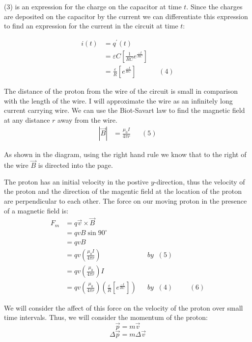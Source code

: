 \documentclass[11pt]{article}
\begin{document}
\vspace{.2in}
\noindent (3) is an expression for the charge on the capacitor at time $t$. Since the charges are deposited on the capacitor by the current we can differentiate this expression to find an expression for the current in the circuit at time $t$: 

\begin{align*}
i(t)&=q^{'}(t)\\&=\varepsilon C\left[\frac{1}{RC}e^{\frac{-t}{RC}}\right]\\&=\frac{\varepsilon}{R}\left[e^{\frac{-t}{RC}}\right]&&(4)
\end{align*}

\vspace{.2in}

\noindent The distance of the proton from the wire of the circuit is small in comparison with the length of the wire. I will approximate the wire as an infinitely long current carrying wire. We can use the Biot-Savart law to find the magnetic field at any distance $r$ away from the wire. 
\begin{align*}
\left|\vec{B}\right|&=\frac{\mu_0I}{4\pi r}&&(5)
\end{align*}

\vspace{.1in}

\noindent As shown in the diagram, using the right hand rule we know that to the right of the wire $\vec{B}$ is directed into the page. 

\vspace{.2in}

\noindent The proton has an initial velocity in the postive $y$-direction, thus the velocity of the proton and the direction of the magentic field at the location of the proton are perpendicular to each other. The force on our moving proton in the presence of a magnetic field is:
\begin{align*}
F_m&=q\vec{v}\times\vec{B}\\&=qvB\sin{90^\circ}\\&=qvB\\&=qv\left(\frac{\mu_0I}{4\pi r}\right)&&by\;\;(5)\\&=qv\left(\frac{\mu_0}{4\pi r}\right)I\\&=qv\left(\frac{\mu_0}{4\pi r}\right)\left(\frac{\varepsilon}{R}\left[e^{\frac{-t}{RC}}\right]\right)&&by\;\;(4)&&&(6)
\end{align*}

\newpage

\noindent We will consider the affect of this force on the velocity of the proton over small time intervals. Thus, we will consider the momentum of the proton:
\[
\vec{p}=m\vec{v}
\] 
\[
\Delta\vec{p}=m\Delta\vec{v}
\]
\end{document}

